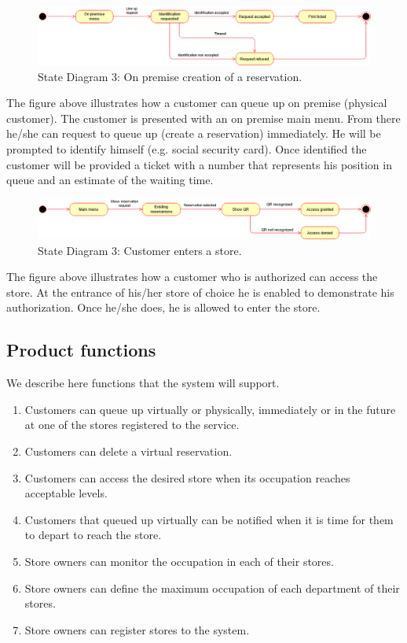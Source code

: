 \begin{figure}[!htb]
	\centering
	\includegraphics[width=\textwidth]{Images/StateDiagram3.png}
	\caption{State Diagram 3: On premise creation of a reservation.}
\end{figure}
The figure above illustrates how a customer can queue up on premise (physical customer). The customer is presented with an on premise main menu. From there he/she can request to queue up (create a reservation) immediately. He will be prompted to identify himself (e.g. social security card). Once identified the customer will be provided a ticket with a number that represents his position in queue and an estimate of the waiting time.

\begin{figure}[!htb]
	\centering
	\includegraphics[width=\textwidth]{Images/StateDiagram4.png}
	\caption{State Diagram 3: Customer enters a store.}
\end{figure}
The figure above illustrates how a customer who is authorized can access the store. At the entrance of his/her store of choice he is enabled to demonstrate his authorization. Once he/she does, he is allowed to enter the store.

\subsection{Product functions}
We describe here functions that the system will support.
\begin{enumerate}
	\item Customers can queue up virtually or physically, immediately or in the future at one of the stores registered to the service.
	\item Customers can delete a virtual reservation.
	\item Customers can access the desired store when its occupation reaches acceptable levels.
	\item Customers that queued up virtually can be notified when it is time for them to depart to reach the store.
	\item Store owners can monitor the occupation in each of their stores.
	\item Store owners can define the maximum occupation of each department of their stores.
	\item Store owners can register stores to the system.
\end{enumerate}

